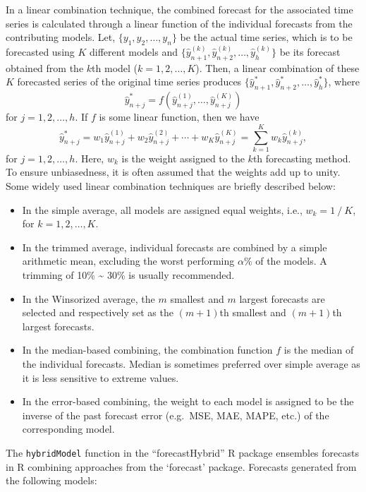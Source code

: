 \documentclass[]{book}
\providecommand{\tightlist}{%
  \setlength{\itemsep}{0pt}\setlength{\parskip}{0pt}}
\begin{document}
In a linear combination technique, the combined forecast for the
associated time series is calculated through a linear function of the
individual forecasts from the contributing models. Let,
\(\{y_1, y_2, \ldots, y_n\}\) be the actual time series, which is to be
forecasted using \(K\) different models and
\(\{\hat{y}_{n+1}^{(k)}, \hat{y}_{n+2}^{(k)}, \ldots, \hat{y}_{h}^{(k)}\}\)
be its forecast obtained from the \(k\)th model (\(k=1, 2,\ldots, K\)).
Then, a linear combination of these \(K\) forecasted series of the
original time series produces
\(\{\hat{y}_{n+1}^{*}, \hat{y}_{n+2}^{*}, \ldots, \hat{y}_{h}^{*}\}\),
where \[
\hat{y}_{n+j}^{*}=f\left(\hat{y}_{n+j}^{(1)},\ldots,\hat{y}_{n+j}^{(K)}\right)
\] for \(j=1,2,\ldots,h\). If \(f\) is some linear function, then we
have \[
\hat{y}_{n+j}^{*}=w_1\hat{y}_{n+j}^{(1)}+w_2\hat{y}_{n+j}^{(2)}+\cdots+w_K\hat{y}_{n+j}^{(K)}
=\sum_{k=1}^{K}w_k\hat{y}_{n+j}^{(k)}, 
\] for \(j=1,2,\ldots,h\). Here, \(w_k\) is the weight assigned to the
\(k\)th forecasting method. To ensure unbiasedness, it is often assumed
that the weights add up to unity. Some widely used linear combination
techniques are briefly described below:

\begin{itemize}
\tightlist
\item
  In the simple average, all models are assigned equal weights, i.e.,
  \(w_k=1⁄K\), for \(k=1, 2,\ldots, K\).
\item
  In the trimmed average, individual forecasts are combined by a simple
  arithmetic mean, excluding the worst performing \(\alpha\)\% of the
  models. A trimming of 10\% \textasciitilde{} 30\% is usually
  recommended.
\item
  In the Winsorized average, the \(m\) smallest and \(m\) largest
  forecasts are selected and respectively set as the \((m+1)\)th
  smallest and \((m+1)\)th largest forecasts.
\item
  In the median-based combining, the combination function \(f\) is the
  median of the individual forecasts. Median is sometimes preferred over
  simple average as it is less sensitive to extreme values.
\item
  In the error-based combining, the weight to each model is assigned to
  be the inverse of the past forecast error (e.g.~MSE, MAE, MAPE, etc.)
  of the corresponding model.
\end{itemize}

The \texttt{hybridModel} function in the ``forecastHybrid'' R package
ensembles forecasts in R combining approaches from the `forecast'
package. Forecasts generated from the following models:
\end{document}
